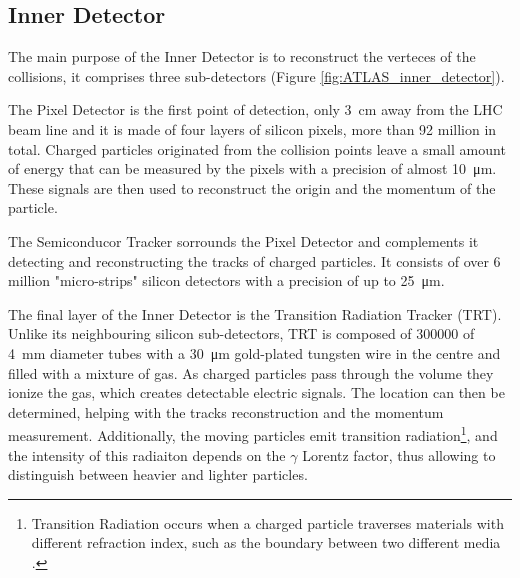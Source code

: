 \subsection{Inner Detector}\label{subsec:ATLAS_inner_detector}

\begin{figure}[hb]
    \centering
    \hfill
    \centering
\end{figure}

The main purpose of the Inner Detector is to reconstruct the verteces of the collisions, it comprises three sub-detectors (Figure \ref{fig:ATLAS_inner_detector}).

The Pixel Detector is the first point of detection, only \qty{3}{\centi\meter} away from the LHC beam line and it is made of four layers of silicon pixels, more than 92 million in total. Charged particles originated from the collision points leave a small amount of energy that can be measured by the pixels with a precision of almost \qty{10}{\micro\meter}. These signals are then used to reconstruct the origin and the momentum of the particle.

The Semiconducor Tracker sorrounds the Pixel Detector and complements it detecting and reconstructing the tracks of charged particles. It consists of over 6 million "micro-strips" silicon detectors with a precision of up to \qty{25}{\micro\meter}.

The final layer of the Inner Detector is the Transition Radiation Tracker (TRT). Unlike its neighbouring silicon sub-detectors, TRT is composed of \num{300000} of \qty{4}{\milli\meter} diameter tubes with a \qty{30}{\micro\meter} gold-plated tungsten wire in the centre and filled with a mixture of gas. As charged particles pass through the volume they ionize the gas, which creates detectable electric signals. The location can then be determined, helping with the tracks reconstruction and the momentum measurement. Additionally, the moving particles emit transition radiation\footnote{Transition Radiation occurs when a charged particle traverses materials with different refraction index, such as the boundary between two different media \cite{wikipediaTransitionRadiation}.}, and the intensity of this radiaiton depends on the $\gamma$ Lorentz factor, thus allowing to distinguish between heavier and lighter particles.


